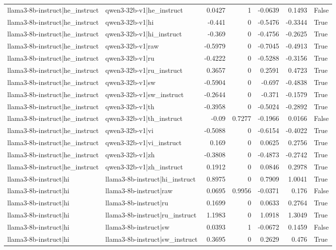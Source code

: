 \begin{table}
\begin{tabular}{l l r r r r l}
llama3-8b-instruct|he_instruct & qwen3-32b-v1|he_instruct & 0.0427 & 1 & -0.0639 & 0.1493 & False \\
llama3-8b-instruct|he_instruct & qwen3-32b-v1|hi & -0.441 & 0 & -0.5476 & -0.3344 & True \\
llama3-8b-instruct|he_instruct & qwen3-32b-v1|hi_instruct & -0.369 & 0 & -0.4756 & -0.2625 & True \\
llama3-8b-instruct|he_instruct & qwen3-32b-v1|raw & -0.5979 & 0 & -0.7045 & -0.4913 & True \\
llama3-8b-instruct|he_instruct & qwen3-32b-v1|ru & -0.4222 & 0 & -0.5288 & -0.3156 & True \\
llama3-8b-instruct|he_instruct & qwen3-32b-v1|ru_instruct & 0.3657 & 0 & 0.2591 & 0.4723 & True \\
llama3-8b-instruct|he_instruct & qwen3-32b-v1|sw & -0.5904 & 0 & -0.697 & -0.4838 & True \\
llama3-8b-instruct|he_instruct & qwen3-32b-v1|sw_instruct & -0.2644 & 0 & -0.371 & -0.1579 & True \\
llama3-8b-instruct|he_instruct & qwen3-32b-v1|th & -0.3958 & 0 & -0.5024 & -0.2892 & True \\
llama3-8b-instruct|he_instruct & qwen3-32b-v1|th_instruct & -0.09 & 0.7277 & -0.1966 & 0.0166 & False \\
llama3-8b-instruct|he_instruct & qwen3-32b-v1|vi & -0.5088 & 0 & -0.6154 & -0.4022 & True \\
llama3-8b-instruct|he_instruct & qwen3-32b-v1|vi_instruct & 0.169 & 0 & 0.0625 & 0.2756 & True \\
llama3-8b-instruct|he_instruct & qwen3-32b-v1|zh & -0.3808 & 0 & -0.4873 & -0.2742 & True \\
llama3-8b-instruct|he_instruct & qwen3-32b-v1|zh_instruct & 0.1912 & 0 & 0.0846 & 0.2978 & True \\
llama3-8b-instruct|hi & llama3-8b-instruct|hi_instruct & 0.8975 & 0 & 0.7909 & 1.0041 & True \\
llama3-8b-instruct|hi & llama3-8b-instruct|raw & 0.0695 & 0.9956 & -0.0371 & 0.176 & False \\
llama3-8b-instruct|hi & llama3-8b-instruct|ru & 0.1699 & 0 & 0.0633 & 0.2764 & True \\
llama3-8b-instruct|hi & llama3-8b-instruct|ru_instruct & 1.1983 & 0 & 1.0918 & 1.3049 & True \\
llama3-8b-instruct|hi & llama3-8b-instruct|sw & 0.0393 & 1 & -0.0672 & 0.1459 & False \\
llama3-8b-instruct|hi & llama3-8b-instruct|sw_instruct & 0.3695 & 0 & 0.2629 & 0.476 & True \\

\end{tabular}
\end{table}
